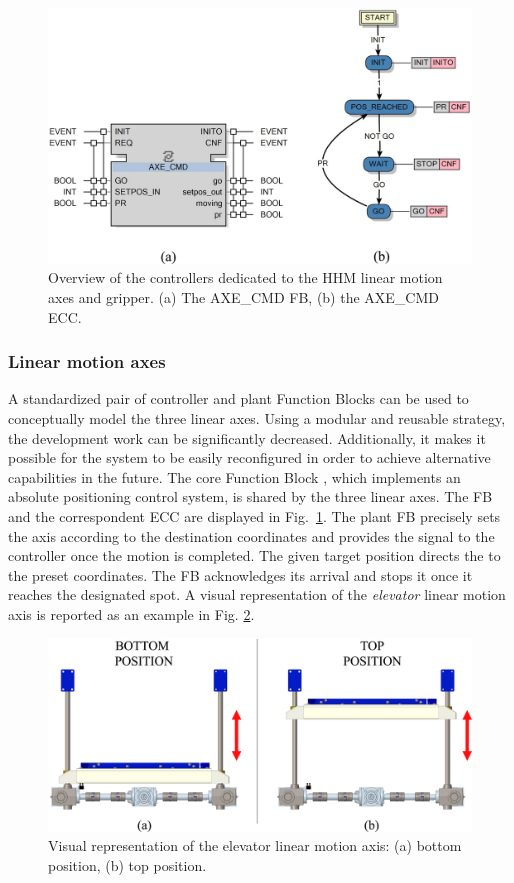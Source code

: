 \documentclass{ieeeojies}
\begin{document}
\begin{figure}[b!]
    \centering
    \includegraphics[width=0.9\columnwidth]{pictures/lilli06.eps}
    \caption{Overview of the controllers dedicated to the HHM linear motion axes and gripper. (a) The AXE\_CMD FB, (b) the AXE\_CMD ECC.} 
    \label{fig:fbs}
\end{figure}

\subsubsection{Linear motion axes}
A standardized pair of controller and plant Function Blocks can be used to conceptually model the three linear axes.
Using a modular and reusable strategy, the development work can be significantly decreased. 
Additionally, it makes it possible for the system to be easily reconfigured in order to achieve alternative capabilities in the future.
The core Function Block , which implements an absolute positioning control system, is shared by the three linear axes. The FB and the correspondent ECC are displayed in \mbox{Fig. \ref{fig:fbs}}.
The plant FB precisely sets the axis according to the destination coordinates and provides the  signal to the controller once the motion is completed.
The given target position directs the  to the preset coordinates. The FB acknowledges its arrival and stops it once it reaches the designated spot. A visual representation of the \textit{elevator} linear motion axis is reported as an example in Fig. \ref{fig:elevator}.

\begin{figure}[b!]
    \centering
    \includegraphics[width=\columnwidth]{pictures/lilli07.eps}
    \caption{Visual representation of the elevator linear motion axis: (a) bottom position, (b) top position. } 
    \label{fig:elevator}
\end{figure}
\end{document}
